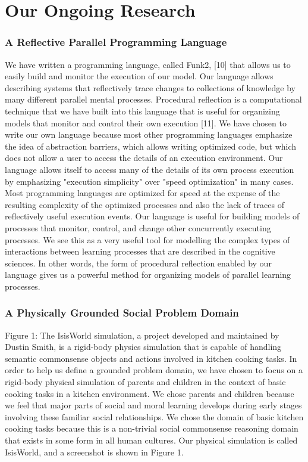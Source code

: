 \section{Our Ongoing Research}

\subsubsection{A Reflective Parallel Programming Language}

We have written a programming language, called Funk2, [10] that allows
us to easily build and monitor the execution of our model. Our
language allows describing systems that reflectively trace changes to
collections of knowledge by many different parallel mental
processes. Procedural reflection is a computational technique that we
have built into this language that is useful for organizing models
that monitor and control their own execution [11]. We have chosen to
write our own language because most other programming languages
emphasize the idea of abstraction barriers, which allows writing
optimized code, but which does not allow a user to access the details
of an execution environment. Our language allows itself to access many
of the details of its own process execution by emphasizing "execution
simplicity" over "speed optimization" in many cases. Most programming
languages are optimized for speed at the expense of the resulting
complexity of the optimized processes and also the lack of traces of
reflectively useful execution events. Our language is useful for
building models of processes that monitor, control, and change other
concurrently executing processes. We see this as a very useful tool
for modelling the complex types of interactions between learning
processes that are described in the cognitive sciences. In other
words, the form of procedural reflection enabled by our language gives
us a powerful method for organizing models of parallel learning
processes.

\subsubsection{A Physically Grounded Social Problem Domain}

Figure 1: The IsisWorld simulation, a project developed and maintained
by Dustin Smith, is a rigid-body physics simulation that is capable of
handling semantic commonsense objects and actions involved in kitchen
cooking tasks.  In order to help us define a grounded problem domain,
we have chosen to focus on a rigid-body physical simulation of parents
and children in the context of basic cooking tasks in a kitchen
environment. We chose parents and children because we feel that major
parts of social and moral learning develops during early stages
involving these familiar social relationships. We chose the domain of
basic kitchen cooking tasks because this is a non-trivial social
commonsense reasoning domain that exists in some form in all human
cultures. Our physical simulation is called IsisWorld, and a
screenshot is shown in Figure 1.

